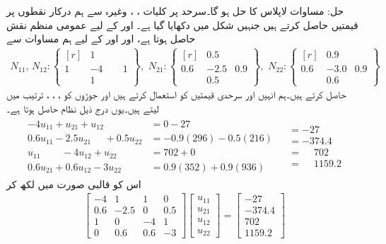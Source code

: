 حل:\quad
مساوات لاپلاس کا حل  ہو گا۔سرحد پر کلیات ، ، وغیرہ سے ہم درکار نقطوں پر قیمتیں حاصل کرتے ہیں جنہیں شکل میں دکھایا گیا ہے۔ اور  کے لیے  عمومی منظم نقش حاصل ہوتا ہے، اور  اور  کے لیے ہم مساوات  سے
\begin{align}\label{مساوات_اعدادی_مثال_لاپلاس_ڈرشلے}
N_{11}, \, N_{12}:
\left\{ 
\begin{matrix*}[r]
&1&\\
1&-4&\phantom{-}1\\
&1&
\end{matrix*}
 \right\},\,\,
N_{21}:\left\{
\begin{matrix*}[r]
&0.5&\\
0.6&-2.5&0.9\\
&0.5&
\end{matrix*}
\right\},\,\,
N_{22}:\left\{
\begin{matrix*}[r]
&0.9&\\
0.6&-3.0&0.9\\
&0.6&
\end{matrix*}
\right\}
\end{align}
حاصل کرتے ہیں۔ہم  انہیں اور سرحدی قیمتیں  کو استعمال کرتے ہیں اور جوڑوں  کو ، ، ،  ترتیب میں  لیتے ہیں۔یوں درج ذیل نظام حاصل ہوتا ہے۔
\begin{gather*}
\begin{aligned}
-4u_{11}+u_{21}+u_{12}\phantom{+u_{32}}&=0-27\\
0.6u_{11}-2.5u_{21}\phantom{u_{32}}+0.5u_{22}&=-0.9(296)-0.5(216)\\
u_{11}\phantom{+u_{32}}-4u_{12}+u_{22}&=702+0\\
0.6u_{21}+0.6u_{12}-3u_{22}&=0.9(352)+0.9(936)
\end{aligned}
\begin{aligned}
&=-27\\
&=-374.4\\
&=\phantom{-}702\\
&=\phantom{-}1159.2
\end{aligned}
\end{gather*}
اس کو قالبی صورت میں لکھ کر
\begin{align}\label{مساوات_اعدادی_مثال_لاپلاس_ڈرشلے_ب}
\begin{bmatrix}
-4&1&1&0\\
0.6&-2.5&0&0.5\\
1&0&-4&1\\
0&0.6&0.6&-3
\end{bmatrix}
\begin{bmatrix}
u_{11}\\
u_{21}\\
u_{12}\\
u_{22}
\end{bmatrix}=
\begin{bmatrix}
-27\\
-374.4\\
702\\
1159.2
\end{bmatrix}
\end{align}

